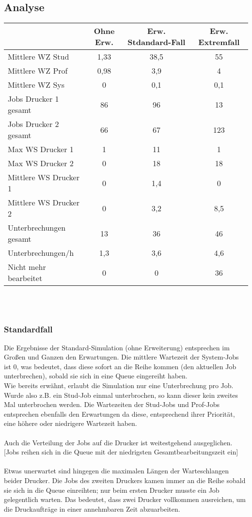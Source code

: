 \documentclass[12pt,a4paper]{article}
\begin{document}
	\subsection{Analyse}
	\begin{tabular}{|l|c|c|c|}
		\hline  & Ohne Erw. & Erw. Stdandard-Fall & Erw. Extremfall \\
		\hline Mittlere WZ Stud 	   & 1,33 & 38,5 & 55 \\ 
		\hline Mittlere WZ Prof 	   & 0,98 & 3,9 & 4 \\ 
		\hline Mittlere WZ Sys 		   & 0 & 0,1 & 0,1 \\ 
		\hline Jobs Drucker 1 gesamt   & 86 & 96 & 13 \\ 
		\hline Jobs Drucker 2 gesamt   & 66 & 67 & 123 \\ 
		\hline Max WS Drucker 1 	   & 1 & 11 & 1 \\ 
		\hline Max WS Drucker 2 	   & 0 & 18 & 18 \\ 
		\hline Mittlere WS Drucker 1   & 0 & 1,4 & 0 \\ 
		\hline Mittlere WS Drucker 2   & 0 & 3,2 & 8,5 \\
		\hline Unterbrechungen gesamt  & 13 & 36 & 46 \\  
		\hline Unterbrechungen/h 	   & 1,3 & 3,6 & 4,6 \\ 
		\hline Nicht mehr bearbeitet   & 0 & 0 & 36 \\
		\hline 
	\end{tabular}
	\\	
	\\
	\subsubsection{Standardfall}
	Die Ergebnisse der Standard-Simulation (ohne Erweiterung) entsprechen im Großen und Ganzen den Erwartungen. Die mittlere Wartezeit der System-Jobs ist 0, was bedeutet, dass diese sofort an die Reihe 
	kommen (den aktuellen Job unterbrechen), sobald sie sich in eine Queue eingereiht haben. \\
	Wie bereits erwähnt, erlaubt die Simulation nur eine Unterbrechung pro Job. Wurde also z.B. ein Stud-Job einmal unterbrochen, so kann dieser kein zweites Mal unterbrochen werden.
	Die Wartezeiten der Stud-Jobs und Prof-Jobs entsprechen ebenfalls den Erwartungen da diese, entsprechend ihrer Priorität, eine höhere oder niedrigere Wartezeit haben.\\
	\\
	Auch die Verteilung der Jobs auf die Drucker ist weitestgehend ausgeglichen.
	[Jobs reihen sich in die Queue mit der niedrigsten Gesamtbearbeitungszeit ein]\\
	\\
	Etwas unerwartet sind hingegen die maximalen Längen der Warteschlangen beider Drucker. Die Jobs des zweiten Druckers kamen immer an die Reihe sobald sie sich in die Queue einreihten; nur beim
	ersten Drucker musste ein Job gelegentlich warten. Das bedeutet, dass zwei Drucker vollkommen ausreichen, um die Druckaufträge in einer annehmbaren Zeit abzuarbeiten.\\
	
\end{document}
